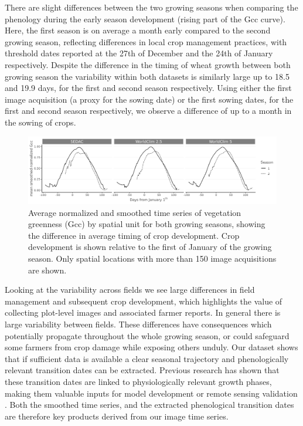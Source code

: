 \documentclass[, manuscript]{copernicus}
\begin{document}
There are slight differences between the two growing seasons when
comparing the phenology during the early season development (rising part
of the Gcc curve). Here, the first season is on average a month early
compared to the second growing season, reflecting differences in local
crop management practices, with threshold dates reported at the 27th of
December and the 24th of January respectively. Despite the difference in
the timing of wheat growth between both growing season the variability
within both datasets is similarly large up to 18.5 and 19.9 days, for
the first and second season respectively. Using either the first image
acquisition (a proxy for the sowing date) or the first sowing dates, for
the first and second season respectively, we observe a difference of up
to a month in the sowing of crops.

\begin{figure}
\includegraphics[width=1\linewidth]{./figures/summary_time_series_2} \caption{Average normalized and smoothed time series of vegetation greenness (Gcc) by spatial unit for both growing seasons, showing the difference in average timing of crop development. Crop development is shown relative to the first of January of the growing season. Only spatial locations with more than 150 image acquisitions are shown.}\label{fig:unnamed-chunk-5}
\end{figure}

Looking at the variability across fields we see large differences in
field management and subsequent crop development, which highlights the
value of collecting plot-level images and associated farmer reports. In
general there is large variability between fields. These differences
have consequences which potentially propagate throughout the whole
growing season, or could safeguard some farmers from crop damage while
exposing others unduly. Our dataset shows that if sufficient data is
available a clear seasonal trajectory and phenologically relevant
transition dates can be extracted. Previous research has shown that
these transition dates are linked to physiologically relevant growth
phases, making them valuable inputs for model development or remote
sensing validation \citep{hufkens2019}. Both the smoothed time series,
and the extracted phenological transition dates are therefore key
products derived from our image time series.
\end{document}

